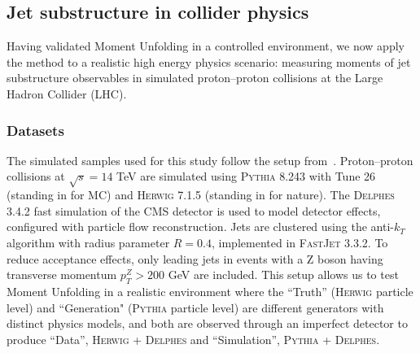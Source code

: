     \subsection{Jet substructure in collider physics}
    \label{subsec:jet-moments}
        Having validated Moment Unfolding in a controlled environment, we now apply the method to a realistic high energy physics scenario: measuring moments of jet substructure observables in simulated proton--proton collisions at the Large Hadron Collider (LHC).
        \subsubsection{Datasets}
            The simulated samples used for this study follow the setup from~\cite{andreassen_omnifold_2020}.
            Proton--proton collisions at $\sqrt{s} = 14$ TeV are simulated using \textsc{Pythia 8.243} with Tune 26 (standing in for MC) and \textsc{Herwig 7.1.5} (standing in for nature).
            The \textsc{Delphes 3.4.2} fast simulation of the CMS detector is used to model detector effects, configured with particle flow reconstruction.
            Jets are clustered using the anti-$k_T$ algorithm with radius parameter $R = 0.4$, implemented in \textsc{FastJet 3.3.2}.
            To reduce acceptance effects, only leading jets in events with a Z boson having transverse momentum $p_T^Z > 200$ GeV are included.
            This setup allows us to test Moment Unfolding in a realistic environment where the ``Truth'' (\textsc{Herwig} particle level) and ``Generation" (\textsc{Pythia} particle level) are different generators with distinct physics models, and both are observed through an imperfect detector to produce ``Data'', \textsc{Herwig + Delphes} and ``Simulation'', \textsc{Pythia + Delphes}.
